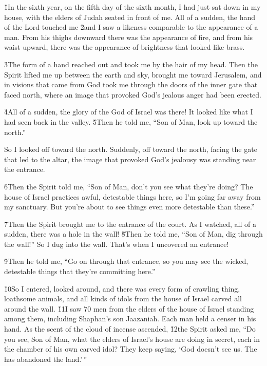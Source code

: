 \v{1}In the sixth year, on the fifth day of the sixth month, I had just sat down in my house, with the elders of Judah seated in front of me. All of a sudden, the hand of the Lord  touched me \v{2}and I saw a likeness comparable to the appearance of a man. From his thighs downward there was the appearance of fire, and from his waist upward, there was the appearance of brightness that looked like brass.

\v{3}The form of a hand reached out and took me by the hair of my head. Then the Spirit lifted me up between the earth and sky, brought me toward Jerusalem, and in visions that came from God took me through the doors of the inner gate that faced north, where an image that provoked God's jealous anger had been erected.

\v{4}All of a sudden, the glory of the God of Israel was there! It looked like what I had seen back in the valley. \v{5}Then he told me, ``Son of Man, look up toward the north.''

So I looked off toward the north. Suddenly, off toward the north, facing the gate that led to the altar, the image that provoked God's jealousy was standing near the entrance.

\v{6}Then the Spirit told me, ``Son of Man, don't you see what they're doing? The house of Israel practices awful, detestable things here, so I'm going far away from my sanctuary. But you're about to see things even more detestable than these.''

\v{7}Then the Spirit brought me to the entrance of the court. As I watched, all of a sudden, there was a hole in the wall! \v{8}Then he told me, ``Son of Man, dig through the wall!'' So I dug into the wall. That's when I uncovered an entrance!

\v{9}Then he told me, ``Go on through that entrance, so you may see the wicked, detestable things that they're committing here.''

\v{10}So I entered, looked around, and there was every form of crawling thing, loathsome animals, and all kinds of idols from the house of Israel carved all around the wall. \v{11}I saw 70 men from the elders of the house of Israel standing among them, including Shaphan's son Jaazaniah. Each man held a censer in his hand. As the scent of the cloud of incense ascended, \v{12}the Spirit asked me, ``Do you see, Son of Man, what the elders of Israel's house are doing in secret, each in the chamber of his own carved idol? They keep saying, `God doesn't see us. The  has abandoned the land.'\,''

